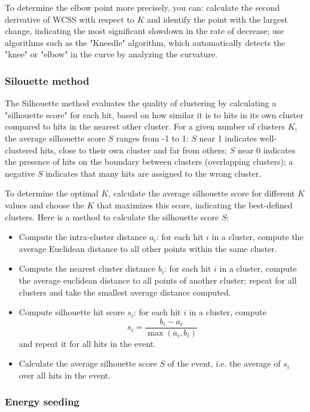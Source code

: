 \documentclass[a4paper,12pt]{article}
\begin{document}
To determine the elbow point more precisely, you can:
calculate the second derivative of WCSS with respect to \( K \) and identify the point with the largest change, indicating the most significant slowdown in the rate of decrease;
use algorithms such as the "Kneedle" algorithm, which automatically detects the "knee" or "elbow" in the curve by analyzing the curvature.

\subsubsection{Silouette method}

The Silhouette method evaluates the quality of clustering by calculating a "silhouette score" for each hit, based on how similar it is to hits in its own cluster compared to hits in the nearest other cluster. For a given number of clusters \( K \), the average silhouette score $S$ ranges from -1 to 1: $S$ near 1 indicates well-clustered hits, close to their own cluster and far from others; $S$ near 0 indicates the presence of hits on the boundary between clusters (overlapping clusters); a negative $S$ indicates that many hits are assigned to the wrong cluster.

To determine the optimal \( K \), calculate the average silhouette score for different \( K \) values and choose the \( K \) that maximizes this score, indicating the best-defined clusters.
Here is a method to calculate the silhouette score $S$:
\begin{itemize}
    \item Compute the intra-cluster distance $a_i$: for each hit $i$ in a cluster, compute the average Euclidean distance to all other points within the same cluster.
    \item Compute the nearest cluster distance $b_i$: for each hit $i$ in a cluster, compute the average euclidean distance to all points of another cluster; repeat for all clusters and take the smallest average distance computed.
    \item Compute silhouette hit score $s_i$: for each hit $i$ in a cluster, compute
    \[
    s_i = \frac{b_i - a_i}{\max(a_i, b_i)}
    \]
    and repeat it for all hits in the event.
    \item Calculate the average silhouette score $S$ of the event, i.e. the average of $s_i$ over all hits in the event.
\end{itemize}

\subsubsection{Energy seeding}
\end{document}
